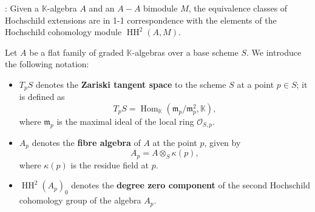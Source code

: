 \documentclass{amsart}
\def\HH{\operatorname{HH}}
\begin{document}
\begin{theorem}\label{theorem:weibel}\cite[Theorem 9.3.1]{Weibel_1994}:
Given a $\mathbb{K}$-algebra $A$ and an $A-A$ bimodule $M$, the equivalence classes of Hochschild extensions are in 1-1 correspondence with the elements of the Hochschild cohomology module $\HH^2(A, M)$.
\end{theorem}
Let \( A \) be a flat family of graded \( \mathbb{K} \)-algebras over a base scheme \( S \). We introduce the following notation:
\begin{itemize}
    \item \( T_p S \) denotes the \textbf{Zariski tangent space} to the scheme \( S \) at a point \( p \in S \); it is defined as 
    \[
    T_p S = \operatorname{Hom}_{\mathbb{K}}(\mathfrak{m}_p / \mathfrak{m}_p^2, \mathbb{K}),
    \]
    where \( \mathfrak{m}_p \) is the maximal ideal of the local ring \( \mathcal{O}_{S,p} \).
    
    \item \( A_p \) denotes the \textbf{fibre algebra} of \( A \) at the point \( p \), given by 
    \[
    A_p = A \otimes_{S} \kappa(p),
    \]
    where \( \kappa(p) \) is the residue field at \( p \).
  
    \item \( \HH^2(A_p)_0 \) denotes the \textbf{degree zero component} of the second Hochschild cohomology group of the algebra \( A_p \).
\end{itemize}
\end{document}
